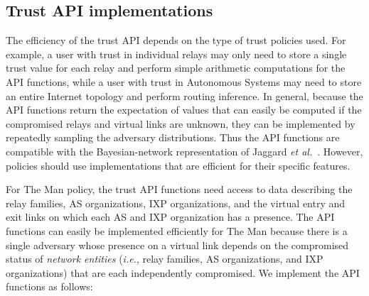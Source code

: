 \documentclass[conference]{styles/IEEEtran}
\newcommand{\etal}{\emph{et al.}}
\newcommand{\ie}{\emph{i.e.}}
\begin{document}
\subsection{Trust API implementations} \label{subsec:algorithm:api_imp}
The efficiency of the trust API depends on the type of trust policies
used. For example, a user with trust in individual relays may only need to store a single
trust value for each relay and perform simple arithmetic computations for the API functions, while a
user with trust in Autonomous Systems may need to store an entire Internet topology and perform
routing inference. In general, because the API functions return the expectation of values that can
easily be computed if the compromised relays and virtual links are unknown, they can be implemented
by repeatedly sampling the adversary distributions. Thus the API functions are compatible with the
Bayesian-network representation of Jaggard \etal~\cite{trustrep-popets14}. However,
policies should use implementations that are efficient for their specific features. 

For \textsf{The Man} policy, the trust API functions need access to data describing the relay
families, AS organizations, IXP organizations, and the virtual entry and exit links on which each AS
and IXP organization has a presence. The API functions can easily be implemented efficiently for
\textsf{The Man} because there is a single adversary whose presence on a virtual link depends on the
compromised status of \textit{network entities} (\ie{}, relay families, AS organizations, and IXP
organizations) that are each independently compromised. We implement the API functions as follows:
\end{document}
